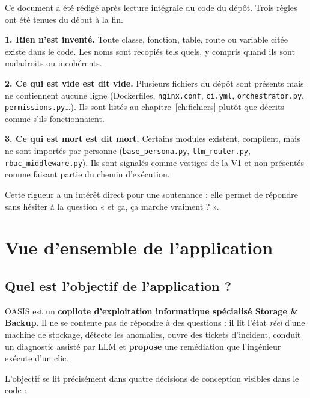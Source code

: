 \documentclass[11pt,a4paper]{report}
\newcommand{\file}[1]{\texttt{\small #1}}
\begin{document}
Ce document a été rédigé après lecture intégrale du code du dépôt. Trois règles
ont été tenues du début à la fin.

\begin{keybox}
\textbf{1. Rien n'est inventé.} Toute classe, fonction, table, route ou variable
citée existe dans le code. Les noms sont recopiés tels quels, y compris quand
ils sont maladroits ou incohérents.

\textbf{2. Ce qui est vide est dit vide.} Plusieurs fichiers du dépôt sont
présents mais ne contiennent aucune ligne (Dockerfiles, \file{nginx.conf},
\file{ci.yml}, \file{orchestrator.py}, \file{permissions.py}\ldots). Ils sont
listés au chapitre~\ref{ch:fichiers} plutôt que décrits comme s'ils
fonctionnaient.

\textbf{3. Ce qui est mort est dit mort.} Certains modules existent, compilent,
mais ne sont importés par personne (\file{base\_persona.py},
\file{llm\_router.py}, \file{rbac\_middleware.py}). Ils sont signalés comme
vestiges de la V1 et non présentés comme faisant partie du chemin d'exécution.
\end{keybox}

\noindent
Cette rigueur a un intérêt direct pour une soutenance : elle permet de répondre
sans hésiter à la question « et ça, ça marche vraiment ? ».

\tableofcontents
\clearpage

\chapter{Vue d'ensemble de l'application}
\label{ch:vue}

\section{Quel est l'objectif de l'application ?}

OASIS est un \textbf{copilote d'exploitation informatique spécialisé Storage \&
Backup}. Il ne se contente pas de répondre à des questions : il lit l'état
\emph{réel} d'une machine de stockage, détecte les anomalies, ouvre des tickets
d'incident, conduit un diagnostic assisté par LLM et \textbf{propose} une
remédiation que l'ingénieur exécute d'un clic.

L'objectif se lit précisément dans quatre décisions de conception visibles dans
le code :
\end{document}
